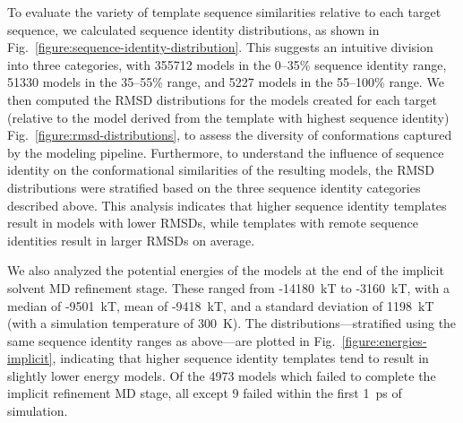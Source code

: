 \documentclass[aps,prl,preprint,nofootinbib,superscriptaddress,linenumbers]{revtex4-1}
\begin{document}
To evaluate the variety of template sequence similarities relative to each target sequence, we calculated sequence identity distributions, as shown in Fig.~\ref{figure:sequence-identity-distribution}.
This suggests an intuitive division into three categories, with \num{355712} models in the 0--35\% sequence identity range, \num{51330} models in the 35--55\% range, and \num{5227} models in the 55--100\% range.
We then computed the RMSD distributions for the models created for each target (relative to the model derived from the template with highest sequence identity) Fig.~\ref{figure:rmsd-distributions}, to assess the diversity of conformations captured by the modeling pipeline.
Furthermore, to understand the influence of sequence identity on the conformational similarities of the resulting models, the RMSD distributions were stratified based on the three sequence identity categories described above.
This analysis indicates that higher sequence identity templates result in models with lower RMSDs, while templates with remote sequence identities result in larger RMSDs on average.

We also analyzed the potential energies of the models at the end of the implicit solvent MD refinement stage.
These ranged from -14180~kT to -3160~kT, with a median of -9501~kT, mean of -9418~kT, and a standard deviation of 1198~kT (with a simulation temperature of 300~K).
The distributions---stratified using the same sequence identity ranges as above---are plotted in Fig.~\ref{figure:energies-implicit}, indicating that higher sequence identity templates tend to result in slightly lower energy models.
Of the \num{4973} models which failed to complete the implicit refinement MD stage, all except 9 failed within the first 1~ps of simulation.

\end{document}
